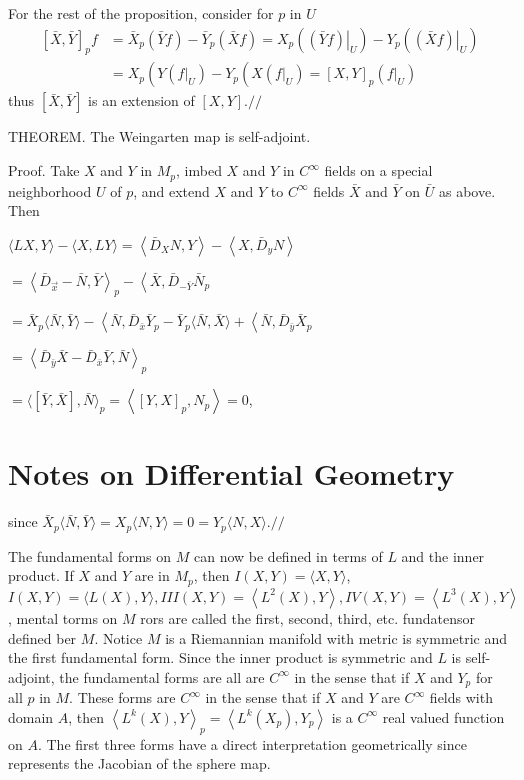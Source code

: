 \documentclass[10pt]{article}
\begin{document}
For the rest of the proposition, consider for $p$ in $U$
$$
\begin{aligned}
{[\bar{X}, \bar{Y}]_{p} f } &=\bar{X}_{p}(\bar{Y} f)-\bar{Y}_{p}(\bar{X} f)=X_{p}\left(\left.(\bar{Y} f)\right|_{U}\right)-Y_{p}\left(\left.(\bar{X} f)\right|_{U}\right) \\
&=X_{p}\left(Y\left(\left.f\right|_{U}\right)-Y_{p}\left(X\left(\left.f\right|_{U}\right)=[X, Y]_{p}\left(\left.f\right|_{U}\right)\right.\right.
\end{aligned}
$$
thus $[\bar{X}, \bar{Y}]$ is an extension of $[X, Y] . / /$

THEOREM. The Weingarten map is self-adjoint.

Proof. Take $X$ and $Y$ in $M_{p}$, imbed $X$ and $Y$ in $C^{\infty}$ fields on a special neighborhood $U$ of $p$, and extend $X$ and $Y$ to $C^{\infty}$ fields $\bar{X}$ and $\bar{Y}$ on $\bar{U}$ as above. Then

$\langle L X, Y\rangle-\langle X, L Y\rangle=\left\langle\bar{D}_{X} N, Y\right\rangle-\left\langle X, \bar{D}_{y} N\right\rangle$

$=\left\langle\bar{D}_{\vec{x}}-\bar{N}, \bar{Y}\right\rangle_{p}-\left\langle\bar{X}, \bar{D}_{-\bar{Y}} \bar{N}_{p}\right.$

$=\bar{X}_{p}\langle\bar{N}, \bar{Y}\rangle-\left\langle\bar{N}, \bar{D}_{\bar{x}} \bar{Y}_{p}-\bar{Y}_{p}\langle\bar{N}, \bar{X}\rangle+\left\langle\bar{N}, \bar{D}_{\bar{y}} \bar{X}_{p}\right.\right.$

$=\left\langle\bar{D}_{\bar{y}} \bar{X}-\bar{D}_{\bar{x}} \bar{Y}, \bar{N}\right\rangle_{p}$

$=\langle[\bar{Y}, \bar{X}], \bar{N}\rangle_{p}=\left\langle[Y, X]_{p}, N_{p}\right\rangle=0$,

\section{Notes on Differential Geometry}
since $\bar{X}_{p}\langle\bar{N}, \bar{Y}\rangle=X_{p}\langle N, Y\rangle=0=Y_{p}\langle N, X\rangle . / /$

The fundamental forms on $M$ can now be defined in terms of $L$ and the inner product. If $X$ and $Y$ are in $M_{p}$, then $I(X, Y)=\langle X, Y\rangle$, $I(X, Y)=\langle L(X), Y\rangle, I I I(X, Y)=\left\langle L^{2}(X), Y\right\rangle, I V(X, Y)=\left\langle L^{3}(X), Y\right\rangle$, mental torms on $M$ rors are called the first, second, third, etc. fundatensor defined ber $M$. Notice $M$ is a Riemannian manifold with metric is symmetric and the first fundamental form. Since the inner product is symmetric and $L$ is self-adjoint, the fundamental forms are all are $C^{\infty}$ in the sense that if $X$ and $Y_{p}$ for all $p$ in $M$. These forms are $C^{\infty}$ in the sense that if $X$ and $Y$ are $C^{\infty}$ fields with domain $A$, then $\left\langle L^{k}(X), Y\right\rangle_{p}=\left\langle L^{k}\left(X_{p}\right), Y_{p}\right\rangle$ is a $C^{\infty}$ real valued function on $A$. The first three forms have a direct interpretation geometrically since represents the Jacobian of the sphere map.
\end{document}
